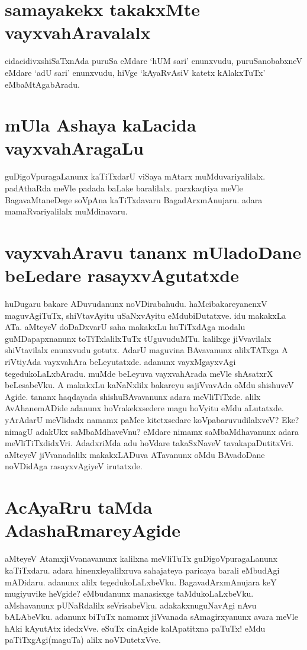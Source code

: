 \section*{samayakekx  takakxMte vayxvahAravalalx}

cidacidivxshiSaTxnAda puruSa eMdare `hUM sari' enunxvudu, puruSanobabxneV eMdare `adU sari' enunxvudu, hiVge `kAyaRvAsiV katetx kAlakxTuTx' eMbaMtAgabAradu.

\section*{mUla Ashaya kaLacida vayxvahAragaLu}

guDigoVpuragaLanunx kaTiTxdarU viSaya mAtarx muMduvariyalilalx. padAthaRda meVle padada baLake baralilalx. parxkaqtiya meVle BagavaMtaneDege soVpAna kaTiTxdavaru BagadArxmAnujaru. adara mamaRvariyalilalx muMdinavaru.

\section*{vayxvahAravu tananx mUladoDane beLedare rasayxvAgutatxde}

huDugaru bakare ADuvudanunx noVDirabahudu. haMcibakareyanenxV maguvAgiTuTx, shiVtavAyitu uSaNxvAyitu eMdubiDutatxve. idu makakxLa ATa. aMteyeV doDaDxvarU saha makakxLu huTiTxdAga modalu guMDapapxnanunx toTiTxlalilxTuTx tUguvuduMTu. kalilxge jiVvavilalx shiVtavilalx enunxvudu gotutx. AdarU maguvina BAvavanunx alilxTATxga A riVtiyAda vayxvahAra beLeyutatxde. adanunx vayxMgayxvAgi tegedukoLaLxbAradu. muMde beLeyuva vayxvahArada meVle shAsatxrX beLesabeVku. A makakxLu kaNaNxlilx bakareyu sajiVvavAda oMdu shishuveV Agide. tananx haqdayada shishuBAvavanunx adara meVliTiTxde. alilx AvAhanemADide adanunx hoVrakekxsedere magu hoVyitu eMdu aLutatxde. yArAdarU meVlidadx namamx paMce kitetxsedare koVpabaruvudilalxveV? Eke? nimagU adakUkx saMbaMdhaveVnu? eMdare nimamx saMbaMdhavanunx adara meVliTiTxdidxVri. AdadxriMda adu hoVdare takaSxNaveV tavakapaDutitxVri. aMteyeV jiVvanadalilx makakxLADuva ATavanunx oMdu BAvadoDane noVDidAga rasayxvAgiyeV irutatxde.

\section*{AcAyaRru taMda AdashaRmareyAgide}

aMteyeV AtamxjiVvanavanunx kalilxna meVliTuTx guDigoVpuragaLanunx kaTiTxdaru. adara hinenxleyalilxruva sahajateya paricaya barali eMbudAgi mADidaru. adanunx alilx tegedukoLaLxbeVku. BagavadArxmAnujara keY mugiyuvike heVgide? eMbudanunx manasisxge taMdukoLaLxbeVku. aMshavanunx pUNaRdalilx seVrisabeVku. adakakxnuguNavAgi nAvu bALAbeVku. adanunx biTuTx namamx jiVvanada sAmagirxyanunx avara meVle hAki kAyutAtx idedxVve. eSuTx cinAgide kalApatitxna paTuTx! eMdu paTiTxgAgi(maguTa) alilx noVDutetxVve. 

